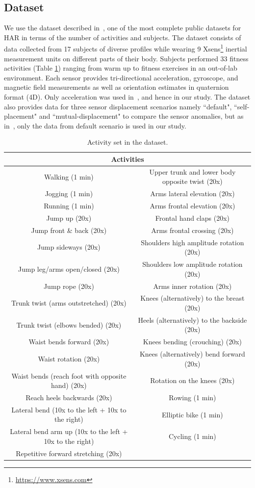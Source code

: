 \documentclass[sigconf]{acmart}
\begin{document}
\subsection{Dataset} \label{sec:dataset} 
 We use the dataset described in~\cite{banos2012benchmark}, one of the most complete public datasets for HAR in terms of the number of activities and subjects. The dataset consists of data collected from 17 subjects of diverse profiles while wearing 9 Xsens\footnote{\url{https://www.xsens.com}} inertial measurement units on different parts of their body. Subjects performed 33 fitness activities (Table \ref{tab:Activites}) ranging from warm up to fitness exercises in an out-of-lab environment. Each sensor provides tri-directional acceleration, gyroscope, and magnetic field measurements as well as orientation estimates in quaternion format (4D). Only acceleration was used in~\cite{banos2014window}, and hence in our study. The dataset also provides data for three sensor displacement scenarios namely ``default", ``self-placement" and ``mutual-displacement" to compare the sensor anomalies, but as in~\cite{banos2014window}, only the data from default scenario is used in our study. 

\begin{table}
  \centering
\begin{tabular}{|c|c|}
\hline 
\multicolumn{2}{|c|}{Activities}\tabularnewline
\hline 
\hline 
Walking (1 min) & Upper trunk and lower body opposite twist (20x)\tabularnewline
\hline 
Jogging (1 min) & Arms lateral elevation (20x)\tabularnewline
\hline 
Running (1 min) & Arms frontal elevation (20x)\tabularnewline
\hline 
Jump up (20x) & Frontal hand claps (20x)\tabularnewline
\hline 
Jump front \& back (20x) & Arms frontal crossing (20x)\tabularnewline
\hline 
Jump sideways (20x) & Shoulders high amplitude rotation (20x)\tabularnewline
\hline 
Jump leg/arms open/closed (20x) & Shoulders low amplitude rotation (20x)\tabularnewline
\hline 
Jump rope (20x) & Arms inner rotation (20x)\tabularnewline
\hline 
Trunk twist (arms outstretched) (20x) & Knees (alternatively) to the breast (20x)\tabularnewline
\hline 
Trunk twist (elbows bended) (20x) & Heels (alternatively) to the backside (20x)\tabularnewline
\hline 
Waist bends forward (20x) & Knees bending (crouching) (20x)\tabularnewline
\hline 
Waist rotation (20x) & Knees (alternatively) bend forward (20x)\tabularnewline
\hline 
Waist bends (reach foot with opposite hand) (20x) & Rotation on the knees (20x)\tabularnewline
\hline 
Reach heels backwards (20x) & Rowing (1 min)\tabularnewline
\hline 
Lateral bend (10x to the left + 10x to the right) & Elliptic bike (1 min)\tabularnewline
\hline 
Lateral bend arm up (10x to the left + 10x to the right) & Cycling (1 min)\tabularnewline
\hline 
Repetitive forward stretching (20x) & \tabularnewline
\hline 
\end{tabular}
        \caption{Activity set in the dataset.}        
        \label{tab:Activites}
\end{table} 
\end{document}
